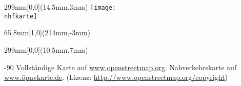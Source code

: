 \documentclass[a4paper]{memoir}
\begin{document}
\pagestyle{empty}


\null
\newpage

\impressum{\redaktionsschluss}
\null
\newpage

\pagestyle{empty}

\begin{textblock*}{299mm}[0,0](14.5mm,3mm)
    \texttt{[image: \\nhfkarte]}
\end{textblock*}

\begin{textblock*}{65.8mm}[1,0](214mm,-3mm)
    \setlength\fboxsep{0pt}
    \setlength\fboxrule{0.4mm}
\end{textblock*}


\begin{textblock*}{299mm}[0,0](10.5mm,7mm)
    \begin{turn}{-90}
        Vollständige Karte auf \url{www.openstreetmap.org}.
        Nahverkehrskarte auf \url{www.öpnvkarte.de}.
		(Lizenz: \url{http://www.openstreetmap.org/copyright})
    \end{turn}
\end{textblock*}
\null
\newpage
\end{document}
